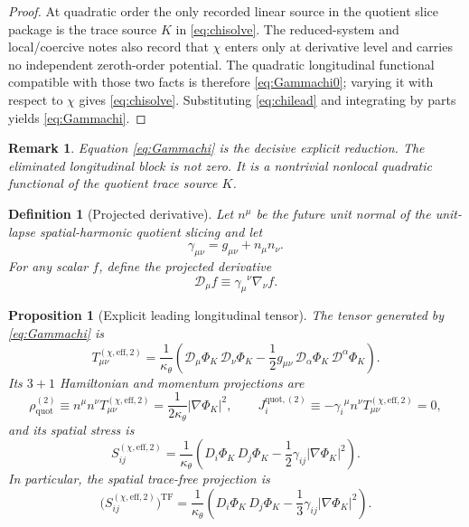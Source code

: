 \documentclass[11pt]{article}
\newcommand{\Dperp}{\mathcal D}
\newtheorem{definition}{Definition}
\newtheorem{proposition}{Proposition}
\newtheorem{remark}{Remark}
\begin{document}
\begin{proof}
At quadratic order the only recorded linear source in the quotient slice package is the trace source \(K\) in \eqref{eq:chisolve}. The reduced-system and local/coercive notes also record that \(\chi\) enters only at derivative level and carries no independent zeroth-order potential. The quadratic longitudinal functional compatible with those two facts is therefore \eqref{eq:Gammachi0}; varying it with respect to \(\chi\) gives \eqref{eq:chisolve}. Substituting \eqref{eq:chilead} and integrating by parts yields \eqref{eq:Gammachi}.
\end{proof}

\begin{remark}
Equation \eqref{eq:Gammachi} is the decisive explicit reduction. The eliminated longitudinal block is not zero. It is a nontrivial nonlocal quadratic functional of the quotient trace source \(K\).
\end{remark}

\begin{definition}[Projected derivative]
\label{def:Dperp}
Let \(n^\mu\) be the future unit normal of the unit-lapse spatial-harmonic quotient slicing and let
\[
\gamma_{\mu\nu}=g_{\mu\nu}+n_\mu n_\nu.
\]
For any scalar \(f\), define the projected derivative
\begin{equation}
\Dperp_\mu f\equiv \gamma_\mu{}^\nu\nabla_\nu f.
\label{eq:Dperp}
\end{equation}
\end{definition}

\begin{proposition}[Explicit leading longitudinal tensor]
\label{prop:Tchi}
The tensor generated by \eqref{eq:Gammachi} is
\begin{equation}
T_{\mu\nu}^{(\chi,\mathrm{eff},2)}
=
\frac{1}{\kappa_\theta}
\left(
\Dperp_\mu\Phi_K\,\Dperp_\nu\Phi_K
-\frac12 g_{\mu\nu}\,\Dperp_\alpha\Phi_K\,\Dperp^\alpha\Phi_K
\right).
\label{eq:Tchi}
\end{equation}
Its \(3+1\) Hamiltonian and momentum projections are
\begin{equation}
\rho_{\mathrm{quot}}^{(2)}
\equiv
n^\mu n^\nu T_{\mu\nu}^{(\chi,\mathrm{eff},2)}
=
\frac{1}{2\kappa_\theta}|\nabla\Phi_K|^2,
\qquad
J_i^{\mathrm{quot},(2)}
\equiv
-\gamma_i{}^\mu n^\nu T_{\mu\nu}^{(\chi,\mathrm{eff},2)}
=
0,
\label{eq:rhoJ}
\end{equation}
and its spatial stress is
\begin{equation}
S_{ij}^{(\chi,\mathrm{eff},2)}
=
\frac{1}{\kappa_\theta}
\left(
D_i\Phi_K\,D_j\Phi_K
-\frac12\gamma_{ij}|\nabla\Phi_K|^2
\right).
\label{eq:Sij}
\end{equation}
In particular, the spatial trace-free projection is
\begin{equation}
\bigl(S_{ij}^{(\chi,\mathrm{eff},2)}\bigr)^{\mathrm{TF}}
=
\frac{1}{\kappa_\theta}
\left(
D_i\Phi_K\,D_j\Phi_K
-\frac13\gamma_{ij}|\nabla\Phi_K|^2
\right).
\label{eq:STF}
\end{equation}
\end{proposition}
\end{document}
